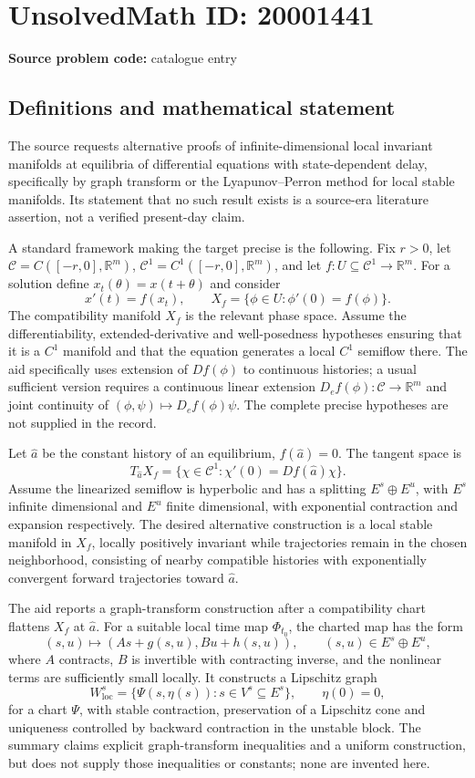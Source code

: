 \documentclass[11pt]{article}
\newcommand{\R}{\mathbb{R}}
\begin{document}
\section*{UnsolvedMath ID: 20001441}
\textbf{Source problem code:} catalogue entry
\subsection{Definitions and mathematical statement}
The source requests alternative proofs of infinite-dimensional local invariant manifolds at equilibria of differential equations with state-dependent delay, specifically by graph transform or the Lyapunov--Perron method for local stable manifolds. Its statement that no such result exists is a source-era literature assertion, not a verified present-day claim.

A standard framework making the target precise is the following. Fix \(r>0\), let \(\mathcal C=C([-r,0],\R^m)\), \(\mathcal C^1=C^1([-r,0],\R^m)\), and let \(f:U\subseteq\mathcal C^1\to\R^m\). For a solution define \(x_t(\theta)=x(t+\theta)\) and consider
\[
 x'(t)=f(x_t),\qquad
 X_f=\{\phi\in U:\phi'(0)=f(\phi)\}.
\]
The compatibility manifold \(X_f\) is the relevant phase space. Assume the differentiability, extended-derivative and well-posedness hypotheses ensuring that it is a \(C^1\) manifold and that the equation generates a local \(C^1\) semiflow there. The aid specifically uses extension of \(Df(\phi)\) to continuous histories; a usual sufficient version requires a continuous linear extension \(D_ef(\phi):\mathcal C\to\R^m\) and joint continuity of \((\phi,\psi)\mapsto D_ef(\phi)\psi\). The complete precise hypotheses are not supplied in the record.

Let \(\widehat a\) be the constant history of an equilibrium, \(f(\widehat a)=0\). The tangent space is
\[
 T_{\widehat a}X_f
 =\{\chi\in\mathcal C^1:\chi'(0)=Df(\widehat a)\chi\}.
\]
Assume the linearized semiflow is hyperbolic and has a splitting \(E^s\oplus E^u\), with \(E^s\) infinite dimensional and \(E^u\) finite dimensional, with exponential contraction and expansion respectively. The desired alternative construction is a local stable manifold in \(X_f\), locally positively invariant while trajectories remain in the chosen neighborhood, consisting of nearby compatible histories with exponentially convergent forward trajectories toward \(\widehat a\).

The aid reports a graph-transform construction after a compatibility chart flattens \(X_f\) at \(\widehat a\). For a suitable local time map \(\Phi_{t_0}\), the charted map has the form
\[
 (s,u)\longmapsto(As+g(s,u),Bu+h(s,u)),\qquad
 (s,u)\in E^s\oplus E^u,
\]
where \(A\) contracts, \(B\) is invertible with contracting inverse, and the nonlinear terms are sufficiently small locally. It constructs a Lipschitz graph
\[
 W^s_{\mathrm{loc}}
 =\{\Psi(s,\eta(s)):s\in V^s\subseteq E^s\},\qquad \eta(0)=0,
\]
for a chart \(\Psi\), with stable contraction, preservation of a Lipschitz cone and uniqueness controlled by backward contraction in the unstable block. The summary claims explicit graph-transform inequalities and a uniform construction, but does not supply those inequalities or constants; none are invented here.
\end{document}
